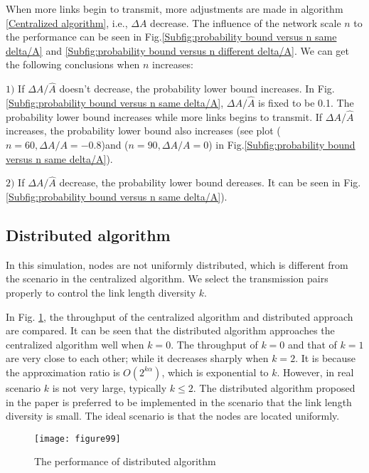 \documentclass[conference]{IEEEtran}
\begin{document}
When more links begin to transmit, more adjustments are made in
algorithm \ref{Centralized algorithm}, i.e., $\Delta A$ decrease.
The influence of the network scale $n$ to the performance can be
seen in Fig.\ref{Subfig:probability bound versus n same delta/A} and
\ref{Subfig:probability bound versus n different delta/A}. We can
get the following conclusions when $n$ increases:

$1)$ If $\Delta A /\hat{A}$ doesn't decrease, the probability lower
bound increases. In Fig.\ref{Subfig:probability bound versus n same
delta/A}, $\Delta A /\hat{A}$ is fixed to be 0.1. The probability
lower bound increases while more links begins to transmit. If
$\Delta A /\hat{A}$ increases, the probability lower bound also
increases (see plot ($n=60, \Delta A/A=-0.8$)and ($n=90, \Delta
A/A=0$) in Fig.\ref{Subfig:probability bound versus n same
delta/A}).

$2)$ If $\Delta A /\hat{A}$ decrease, the probability lower bound
dereases. It can be seen in Fig.\ref{Subfig:probability bound versus
n same delta/A}).










\subsection{Distributed algorithm}
In this simulation, nodes are not uniformly distributed, which is
different from the scenario in the centralized algorithm. We select
the transmission pairs properly to control the link length diversity
$k$.

In Fig. \ref{Fig:Performance of distributed algorithm}, the
throughput of the centralized algorithm and distributed approach are
compared. It can be seen that the distributed algorithm approaches
the centralized algorithm well when $k=0$. The throughput of $k=0$
and that of $k=1$ are very close to each other; while it decreases
sharply when $k=2$. It is because the approximation ratio is
$O(2^{k\alpha})$, which is exponential to $k$. However, in real
scenario $k$ is not very large, typically $k\leq 2$. The distributed
algorithm proposed in the paper is preferred to be implemented in
the scenario that the link length diversity is small. The ideal
scenario is that the nodes are located uniformly.
\begin{figure}[!h]
\centering
\texttt{[image: figure99]}
\caption{The performance of distributed algorithm}
\label{Fig:Performance of distributed algorithm}
\end{figure}
\end{document}
